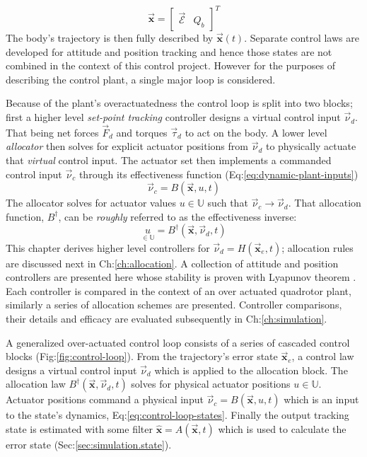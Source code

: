 \\
\vspace{-5pt}
\begin{equation}
\vec{\mathbf{x}}=\begin{bmatrix}\vec{\mathcal{E}}&Q_b\end{bmatrix}^T
\end{equation}
The body's trajectory is then fully described by $\vec{\mathbf{x}}(t)$. Separate control laws are developed for attitude and position tracking and hence those states are not combined in the context of this control project. However for the purposes of describing the control plant, a single major loop is considered.
\par
Because of the plant's overactuatedness the control loop is split into two blocks; first a higher level \emph{set-point tracking} controller designs a virtual control input $\vec{\nu}_d$. That being net forces $\vec{F}_d$ and torques $\vec{\tau}_d$ to act on the body. A lower level \emph{allocator} then solves for explicit actuator positions from $\vec{\nu}_d$ to physically actuate that \emph{virtual} control input. The actuator set then implements a commanded control input $\vec{\nu}_c$ through its effectiveness function (Eq:\ref{eq:dynamic-plant-inputs})
\begin{equation}\label{eq:control-effectiveness}
\vec{\nu}_c=B(\vec{\mathbf{x}},u,t)
\end{equation}
The allocator solves for actuator values $u\in\mathbb{U}$ such that $\vec{\nu}_c\rightarrow\vec{\nu}_d$. That allocation function, $B^\dagger$, can be \emph{roughly} referred to as the effectiveness inverse:
\begin{equation}
\underset{\in\mathbb{U}}{u}=B^{\dagger}(\vec{\mathbf{x}},\vec{\nu}_d,t)
\end{equation}
This chapter derives higher level controllers for $\vec{\nu}_d=H(\vec{\mathbf{x}}_e,t)$; allocation rules are discussed next in Ch:\ref{ch:allocation}. A collection of attitude and position controllers are presented here whose stability is proven with Lyapunov theorem \cite{bojelayupanov,lyapunovstabilitytheorem,noteonlyapunov}. Each controller is compared in the context of an over actuated quadrotor plant, similarly a series of allocation schemes are presented. Controller comparisons, their details and efficacy are evaluated subsequently in Ch:\ref{ch:simulation}. 
\par
A generalized over-actuated control loop consists of a series of cascaded control blocks (Fig:\ref{fig:control-loop}). From the trajectory's error state $\vec{\mathbf{x}}_e$, a control law designs a virtual control input $\vec{\nu}_d$ which is applied to the allocation block. The allocation law $B^{\dagger}(\vec{\mathbf{x}},\vec{\nu}_d,t)$ solves for physical actuator positions $u\in\mathbb{U}$. Actuator positions command a physical input $\vec{\nu}_c=B(\vec{\mathbf{x}},u,t)$ which is an input to the state's dynamics, Eq:\ref{eq:control-loop-states}. Finally the output tracking state is estimated with some filter $\hat{\mathbf{x}}=A(\vec{\mathbf{x}},t)$ which is used to calculate the error state (Sec:\ref{sec:simulation.state}).
